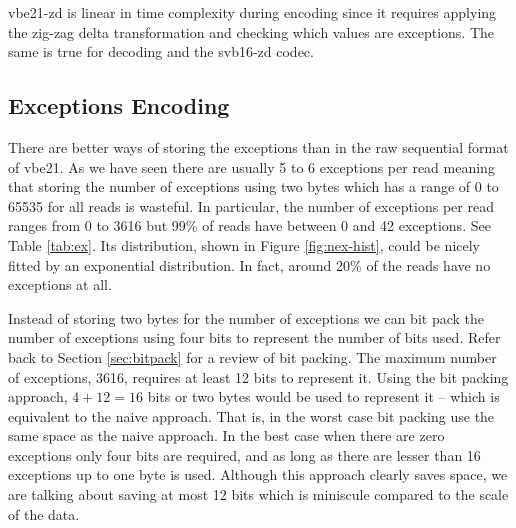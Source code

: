 vbe21-zd is linear in time complexity during encoding since it requires
applying the zig-zag delta transformation and checking which values are
exceptions. The same is true for decoding and the svb16-zd codec.

%

\subsection{Exceptions Encoding}

There are better ways of storing the exceptions than in the raw sequential
format of vbe21.
As we have seen there are usually 5 to 6 exceptions per read meaning that
storing the number of exceptions using two bytes which has a range of 0 to 65535
for all reads is wasteful.
In particular, the number of exceptions per read ranges from 0 to 3616 but 99\%
of reads have between 0 and 42 exceptions. See Table \ref{tab:ex}. Its
distribution, shown in Figure \ref{fig:nex-hist}, could be nicely fitted by an
exponential distribution. In fact, around 20\% of the reads have no exceptions
at all.




Instead of storing two bytes for the number of exceptions we can bit pack the
number of exceptions using four bits to represent the number of bits used.
Refer back to Section \ref{sec:bitpack} for a review of bit packing.
The maximum number of exceptions, 3616, requires at least
12 bits to represent it. Using the bit packing approach, $4+12=16$ bits or two
bytes would be used to represent it -- which is equivalent to the naive
approach. That is, in the worst case bit packing use the same space as the naive
approach. In the best case when there are zero exceptions only four bits are
required, and as long as there are lesser than 16 exceptions up to one byte is
used. Although this approach clearly saves space, we are talking about saving at
most 12 bits which is miniscule compared to the scale of the data.

